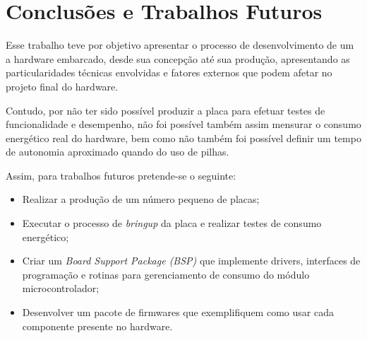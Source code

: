 \chapter{Conclusões e Trabalhos Futuros}
\label{chap:conclusoes-e-trabalhos-futuros}

Esse trabalho teve por objetivo apresentar o processo de desenvolvimento de um a hardware embarcado, desde sua concepção até sua produção, apresentando as particularidades técnicas envolvidas e fatores externos que podem afetar no projeto final do hardware. 

Contudo, por não ter sido possível produzir a placa para efetuar testes de funcionalidade e desempenho, não foi possível também assim mensurar o consumo energético real do hardware, bem como não também foi possível definir um tempo de autonomia aproximado quando do uso de pilhas.

Assim, para trabalhos futuros pretende-se o seguinte:

\begin{itemize}
    \item Realizar a produção de um número pequeno de placas;
    \item Executar o processo de \textit{bringup} da placa e realizar testes de consumo energético;
    \item Criar um \textit{Board Support Package (BSP)} que implemente drivers, interfaces de programação e rotinas para gerenciamento de consumo do módulo microcontrolador;
    \item Desenvolver um pacote de firmwares que exemplifiquem como usar cada componente presente no hardware.
\end{itemize}















